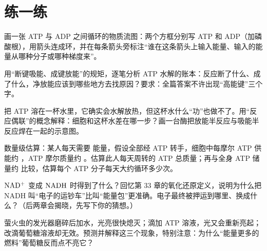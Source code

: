 \section*{练一练}

\begin{sikaoti}
\item 画一张 ATP 与 ADP 之间循环的物质流图：两个方框分别写 ATP 和 ADP（加磷酸根），用箭头连成环，并在每条箭头旁标注“谁在这条箭头上输入能量、输入的能量从哪种分子或哪种梯度来”。
\item 用“断键吸能、成键放能”的规矩，逐笔分析 ATP 水解的账本：反应断了什么、成了什么，净放能应该到哪些地方去找原因？要求：全篇答案不许出现“高能键”三个字。
\item 把 ATP 溶在一杯水里，它确实会水解放热，但这杯水什么“功”也做不了。用“反应偶联”的概念解释：细胞和这杯水差在哪一步？画一台酶把放能半反应与吸能半反应焊在一起的示意图。
\item 数量级估算：某人每天需要  能量，假设全部经 ATP 转手，细胞中每摩尔 ATP 供能约 ，ATP 摩尔质量约 。估算此人每天周转的 ATP 总质量；再与全身 ATP 储量约  比较，估算每个 ATP 分子每天大约循环多少次。
\item $\mathrm{NAD^+}$ 变成 $\mathrm{NADH}$ 时得到了什么？回忆第 33 章的氧化还原定义，说明为什么把 NADH 叫“电子的运钞车”比叫“能量包”更准确。电子最终被押运到哪里、换成什么？（后两章会揭晓，先写下你的猜想。）
\item 萤火虫的发光器磨碎后加水，光亮很快熄灭；滴加 ATP 溶液，光又会重新亮起；改滴葡萄糖溶液却无效。预测并解释这三个现象，特别注意：为什么“能量更多的燃料”葡萄糖反而点不亮它？
\end{sikaoti}

